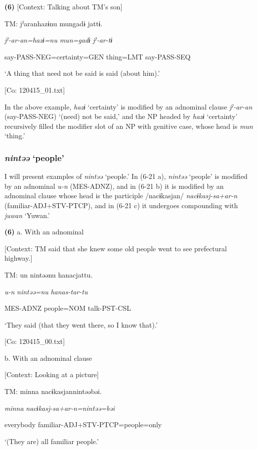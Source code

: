 \textbf{(6)}  [Context: Talking about TM’s son]

  TM:  jˀaranhazɨnu  mungadɨ  jattɨ.

    \textit{jˀ-ar-an=hazɨ=nu}  \textit{mun=gadɨ}  \textit{jˀ-ar-tɨ}

    say-PASS-NEG=certainty=GEN  thing=LMT  say-PASS-SEQ

    ‘A thing that need not be said is said (about him).’

    [Co: 120415\_01.txt]

In the above example, \textit{hazɨ} ‘certainty’ is modified by an adnominal clause \textit{jˀ-ar-an} (say-PASS-NEG) ‘(need) not be said,’ and the NP headed by \textit{hazɨ} ‘certainty’ recursively filled the modifier slot of an NP with genitive case, whose head is \textit{mun} ‘thing.’

\subsubsection{\textit{nintəə} ‘people’}

I will present examples of \textit{nintəə} ‘people.’ In (6-21 a), \textit{nintəə} ‘people’ is modified by an adnominal \textit{u-n} (MES-ADNZ), and in (6-21 b) it is modified by an adnominal clause whose head is the participle /nacɨkasjan/ \textit{nacɨkasj-sa+ar-n} (familiar-ADJ+STV-PTCP), and in (6-21 c) it undergoes compounding with \textit{juwan} ‘Yuwan.’

\textbf{(6)}  a.  With an adnominal

    [Context: TM said that she knew some old people went to see prefectural highway.]

    TM:  un  nintəənu  hanacjattu.

      \textit{u-n}  \textit{nintəə=nu}  \textit{hanas-tar-tu}

      MES-ADNZ  people=NOM  talk-PST-CSL

      ‘They said (that they went there, so I know that).’

      [Co: 120415\_00.txt]

  b.  With an adnominal clause

    [Context: Looking at a picture]

    TM:  minna  nacɨkasjannintəəbəi.

      \textit{minna}  \textit{nacɨkasj-sa+ar-n=nintəə=bəi}

      everybody  familiar-ADJ+STV-PTCP=people=only

      ‘(They are) all familiar people.’

